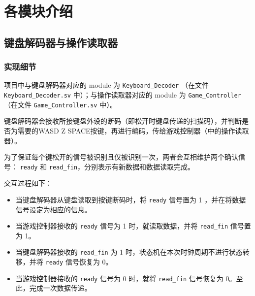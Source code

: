 \section{各模块介绍}

\subsection{键盘解码器与操作读取器} \label{subsection:keyboard-decoder}

\subsubsection{实现细节}
项目中与键盘解码器对应的 module 为 \texttt{Keyboard\_Decoder} （在文件 \texttt{Keyboard\_Decoder.sv} 中）；与操作读取器对应的 module 为 \texttt{Game\_Controller} （在文件 \texttt{Game\_Controller.sv} 中）。

键盘解码器会接收所接键盘外设的断码（即松开时键盘传递的扫描码），并判断是否为需要的WASD Z SPACE按键，再进行编码，传给游戏控制器（中的操作读取器）。

为了保证每个键松开的信号被识别且仅被识别一次，两者会互相维护两个确认信号： \texttt{ready} 和 \texttt{read\_fin}，分别表示有新数据和数据读取完成。

交互过程如下：
\begin{itemize}
  \item 当键盘解码器从键盘读取到按键断码时，将 \texttt{ready} 信号置为 1 ，并在将数据信号设定为相应的信息。
  \item 当游戏控制器接收的 \texttt{ready} 信号为 1 时，就读取数据，并将 \texttt{read\_fin} 信号置为 1。
  \item 当键盘解码器接收的 \texttt{read\_fin} 为 1 时，状态机在本次时钟周期不进行状态转移，并将 \texttt{ready} 信号恢复为 0。
  \item 当游戏控制器接收的 \texttt{ready} 信号为 0 时，就将 \texttt{read\_fin} 信号恢复为 0。至此，完成一次数据传递。
\end{itemize}



